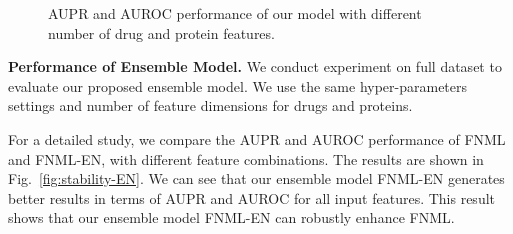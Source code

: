 \documentclass[conference]{IEEEtran}
\begin{document}
\begin{figure}[!ht]
\centering
{}
\vspace*{-10pt}
\caption{AUPR and AUROC performance of our model with different number of drug and protein features.}\label{fig:parameter}
\end{figure}

\textbf{Performance of Ensemble Model.} 
We conduct experiment on full dataset to evaluate our proposed ensemble model. We use the same hyper-parameters settings and number of feature dimensions for drugs and proteins.

For a detailed study, we compare the AUPR and AUROC performance of FNML and FNML-EN, with different feature combinations. The results are shown in Fig.~\ref{fig:stability-EN}. We can see that our ensemble model FNML-EN generates better results in terms of AUPR and AUROC for all input features. This result shows that our ensemble model FNML-EN can robustly enhance FNML.
\end{document}
